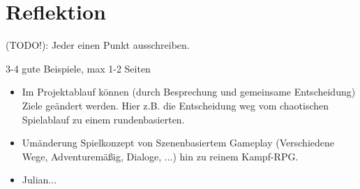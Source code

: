 
\section{Reflektion}
(TODO!): Jeder einen Punkt ausschreiben. 

3-4 gute Beispiele, max 1-2 Seiten

\begin{itemize}
    
    
    \item Im Projektablauf können (durch Besprechung und gemeinsame Entscheidung) Ziele geändert werden. Hier z.B. die Entscheidung weg vom chaotischen Spielablauf zu einem rundenbasierten. 

    \item Umänderung Spielkonzept von Szenenbasiertem Gameplay (Verschiedene Wege, Adventuremäßig, Dialoge, ...) hin zu reinem Kampf-RPG.  
    
    \item Julian...
    

\end{itemize}


